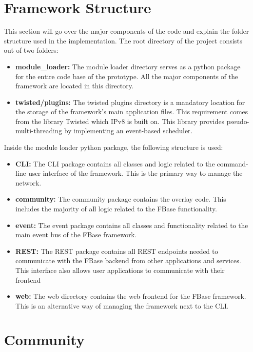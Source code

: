 \section{Framework Structure}

This section will go over the major components of the code and explain the folder structure used in the implementation. The root directory of the project consists out of two folders:
\begin{itemize}
	\item \textbf{module\_loader:} The module loader directory serves as a python package for the entire code base of the prototype. All the major components of the framework are located in this directory.
	\item \textbf{twisted/plugins:} The twisted plugins directory is a mandatory location for the storage of the framework's main application files. This requirement comes from the library Twisted which IPv8 is built on. This library provides pseudo-multi-threading by implementing an event-based scheduler.
\end{itemize}

Inside the module loader python package, the following structure is used:

\begin{itemize}
	\item \textbf{CLI:} The CLI package contains all classes and logic related to the command-line user interface of the framework. This is the primary way to manage the network.
	\item \textbf{community:} The community package contains the overlay code. This includes the majority of all logic related to the FBase functionality.
	\item \textbf{event:} The event package contains all classes and functionality related to the main event bus of the FBase framework.
	\item \textbf{REST:} The REST package contains all REST endpoints needed to communicate with the FBase backend from other applications and services. This interface also allows user applications to communicate with their frontend
	\item \textbf{web:} The web directory contains the web frontend for the FBase framework. This is an alternative way of managing the framework next to the CLI.
\end{itemize}

\section{Community}

